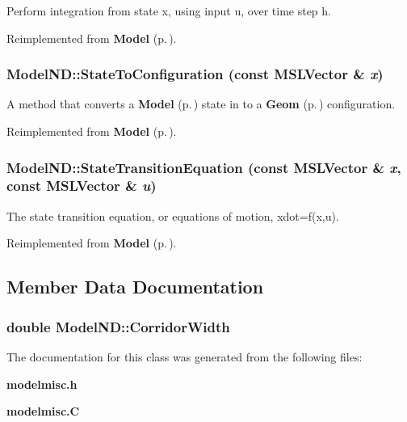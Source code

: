 Perform integration from state x, using input u, over time step h.



Reimplemented from {\bf Model} {\rm (p.\,\pageref{classModel_a5})}.
\subsubsection{ Model\-ND::State\-To\-Configuration (const {\bf MSLVector} \& {\em x})\hspace{0.3cm}{\tt  [virtual]}}\label{classModelND_a2}


A method that converts a {\bf Model} {\rm (p.\,\pageref{classModel})} state in to a {\bf Geom} {\rm (p.\,\pageref{classGeom})} configuration.



Reimplemented from {\bf Model} {\rm (p.\,\pageref{classModel_a8})}.
\subsubsection{ Model\-ND::State\-Transition\-Equation (const {\bf MSLVector} \& {\em x}, const {\bf MSLVector} \& {\em u})\hspace{0.3cm}{\tt  [virtual]}}\label{classModelND_a4}


The state transition equation, or equations of motion, xdot=f(x,u).



Reimplemented from {\bf Model} {\rm (p.\,\pageref{classModel_a3})}.

\subsection{Member Data Documentation}
\subsubsection{\setlength{\rightskip}{0pt plus 5cm}double Model\-ND::Corridor\-Width}\label{classModelND_m0}




The documentation for this class was generated from the following files:\begin{CompactItemize}
\item 
{\bf modelmisc.h}\item 
{\bf modelmisc.C}\end{CompactItemize}

